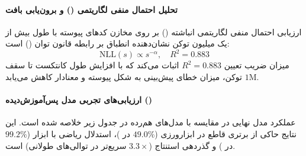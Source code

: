 \paragraph*{تحلیل احتمال منفی لگاریتمی () و برون‌یابی بافت}
ارزیابی احتمال منفی لگاریتمی انباشته () بر روی مخازن کدهای پیوسته با طول بیش از یک میلیون توکن نشان‌دهنده انطباق بر رابطه قانون توان () است:
\begin{equation}
    \text{NLL}(s) \propto s^{-\alpha}, \quad R^2 = 0.883
\end{equation}
میزان ضریب تعیین $R^2 = 0.883$ اثبات می‌کند که با افزایش طول کانتکست تا سقف $1\text{M}$ توکن، میزان خطای پیش‌بینی به شکل پیوسته و معنادار کاهش می‌یابد.

\paragraph*{ارزیابی‌های تجربی مدل پس‌آموزش‌دیده ()}
عملکرد مدل نهایی  در مقایسه با مدل‌های هم‌رده در جدول زیر خلاصه شده است. این نتایج حاکی از برتری قاطع در ابزارورزی ($49.0\%$ در )، استدلال ریاضی با ابزار ($99.2\%$ در ) و گذردهی استنتاج ($3.3\times$ سریع‌تر در توالی‌های طولانی) است.

